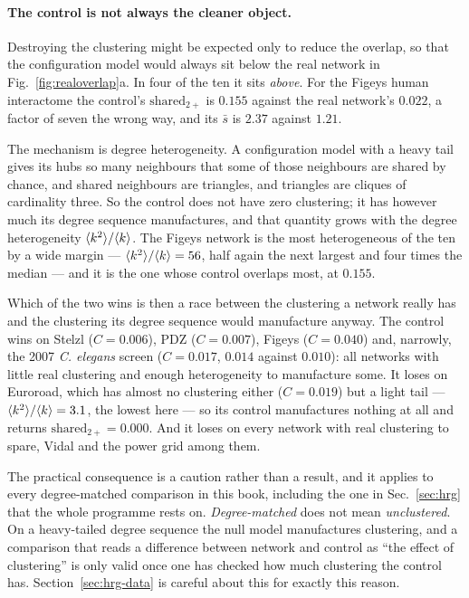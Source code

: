 \paragraph{The control is not always the cleaner object.} Destroying the
clustering might be expected only to reduce the overlap, so that the
configuration model would always sit below the real network in
Fig.~\ref{fig:realoverlap}a. In four of the ten it sits \emph{above}. For the
Figeys human interactome the control's $\mathrm{shared}_{2+}$ is $0.155$ against
the real network's $0.022$, a factor of seven the wrong way, and its $\bar s$ is
$2.37$ against $1.21$.

The mechanism is degree heterogeneity. A configuration model with a heavy tail
gives its hubs so many neighbours that some of those neighbours are shared by
chance, and shared neighbours are triangles, and triangles are cliques of
cardinality three. So the control does not have zero clustering; it has however
much its degree sequence manufactures, and that quantity grows with the degree
heterogeneity $\langle k^{2} \rangle/\langle k \rangle$. The Figeys network is the most heterogeneous of
the ten by a wide margin --- $\langle k^{2} \rangle/\langle k \rangle=56$, half again the next
largest and four times the median --- and it is the one whose control overlaps
most, at $0.155$.

Which of the two wins is then a race between the clustering a network really has
and the clustering its degree sequence would manufacture anyway. The control
wins on Stelzl ($C=0.006$), PDZ ($C=0.007$), Figeys ($C=0.040$) and, narrowly,
the 2007 \emph{C. elegans} screen ($C=0.017$, $0.014$ against $0.010$): all
networks with little real clustering and enough heterogeneity to manufacture
some. It loses on Euroroad, which has almost no clustering either ($C=0.019$)
but a light tail --- $\langle k^{2} \rangle/\langle k \rangle=3.1$, the lowest here --- so its
control manufactures nothing at all and returns $\mathrm{shared}_{2+}=0.000$.
And it loses on every network with real clustering to spare, Vidal and the power
grid among them.

The practical consequence is a caution rather than a result, and it applies to
every degree-matched comparison in this book, including the one in
Sec.~\ref{sec:hrg} that the whole programme rests on. \emph{Degree-matched}
does not mean \emph{unclustered}. On a heavy-tailed degree sequence the null
model manufactures clustering, and a comparison that reads a difference between
network and control as ``the effect of clustering'' is only valid once one has
checked how much clustering the control has. Section~\ref{sec:hrg-data} is careful
about this for exactly this reason.


